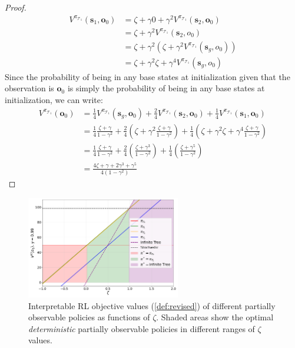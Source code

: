 \begin{proof}
\begin{align*}
    V^{\pi_{\mathcal{T}_1}} (\boldsymbol{s}_1, \boldsymbol{o}_0) &= \zeta + \gamma 0 + \gamma^2 V^{\pi_{\mathcal{T}_1}} (\boldsymbol{s}_2, \boldsymbol{o}_0) \\
    &= \zeta + \gamma^2 V^{\pi_{\mathcal{T}_1}} (\boldsymbol{s}_2, o_0) \\
    &= \zeta + \gamma^2 (\zeta + \gamma^2 V^{\pi_{\mathcal{T}_1}} (\boldsymbol{s}_g, o_0)) \\
    &= \zeta + \gamma^2 \zeta + \gamma^4 V^{\pi_{\mathcal{T}_1}} (\boldsymbol{s}_g, o_0)
\end{align*}
Since the probability of being in any base states at initialization given that the observation is $\boldsymbol{o}_0$ is simply the probability of being in any base states at initialization, we can write:
\begin{align*}
    V^{\pi_{\mathcal{T}_1}} (\boldsymbol{o}_0) &= \frac{1}{4} V^{\pi_{\mathcal{T}_1}} (\boldsymbol{s}_g, \boldsymbol{o}_0) + \frac{2}{4} V^{\pi_{\mathcal{T}_1}} (\boldsymbol{s}_2, \boldsymbol{o}_0) + \frac{1}{4} V^{\pi_{\mathcal{T}_1}} (\boldsymbol{s}_1, \boldsymbol{o}_0) \\
    &= \frac{1}{4} \frac{\zeta + \gamma}{1 - \gamma^2} + \frac{2}{4} (\zeta + \gamma^2 \frac{\zeta + \gamma}{1 - \gamma^2}) + \frac{1}{4} (\zeta + \gamma^2 \zeta + \gamma^4 \frac{\zeta + \gamma}{1 - \gamma^2}) \\
    &= \frac{1}{4} \frac{\zeta + \gamma}{1 - \gamma^2} + \frac{2}{4} (\frac{\zeta + \gamma ^ 3}{1-\gamma^2}) + \frac{1}{4}(\frac{\zeta+\gamma^5}{1-\gamma^2}) \\
    &= \frac{4\zeta + \gamma + 2\gamma^3 + \gamma^5}{4(1-\gamma^2)}
\end{align*}
\end{proof}
\begin{figure}
    \centering
    \includegraphics[width=0.6\textwidth]{images/images_part1/objective_values_plot.pdf}
    \caption{Interpretable RL objective values (\ref{def:revised}) of different partially observable policies as functions of $\zeta$. Shaded areas show the optimal \textit{deterministic} partially observable policies in different ranges of $\zeta$ values.}\label{fig:objectives}
\end{figure}

